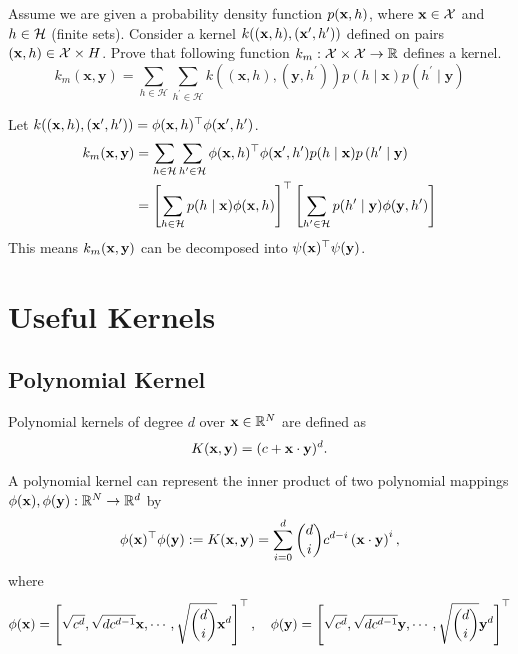 \begin{exercise} Assume we are given a probability density function $p(\mathbf{x}, h)$, where $\mathbf{x} \in  \mathcal{X}$ and $h \in  \mathcal{H}$ (finite sets). Consider a kernel $k((\mathbf{x}, h), (\mathbf{x}', h'))$ defined on pairs $(\mathbf{x}, h) \in  \mathcal{X} \times H$. Prove that following function $k_m: \mathcal{X} \times \mathcal{X} \rightarrow \mathbb{R}$ defines a kernel.
$$
k_{m}(\mathbf{x}, \mathbf{y})=\sum_{h \in \mathcal{H}} \sum_{h^{\prime} \in \mathcal{H}} k\left((\mathbf{x}, h),\left(\mathbf{y}, h^{\prime}\right)\right) p(h \mid \mathbf{x}) p\left(h^{\prime} \mid \mathbf{y}\right)
$$
\end{exercise}
\begin{sol}
Let $k((\mathbf{x}, h), (\mathbf{x}', h')) = \phi(\mathbf{x}, h)^\top \phi(\mathbf{x}', h')$.
\begin{align}
	k_m(\mathbf{x}, \mathbf{y}) & = \sum_{h \in \mathcal{H}} \sum_{h' \in \mathcal{H}} \phi(\mathbf{x}, h)^\top \phi(\mathbf{x}', h') p(h \mid \mathbf{x}) p\left(h^{\prime} \mid \mathbf{y}\right) \\
	& = \left[ \sum_{h \in \mathcal{H}} p(h \mid \mathbf{x}) \phi(\mathbf{x}, h) \right]^\top \left[ \sum_{h' \in \mathcal{H}} p(h' \mid \mathbf{y}) \phi(\mathbf{y}, h') \right]
\end{align}
This means $k_m(\mathbf{x}, \mathbf{y})$ can be decomposed into $\psi(\mathbf{x})^\top \psi(\mathbf{y})$.
\end{sol}


\section{Useful Kernels}
\subsection{Polynomial Kernel}
\begin{definition} Polynomial kernels of degree $d$ over $\mathbf{x} \in \mathbb{R}^N$ are defined as
	$$
	K(\mathbf{x}, \mathbf{y}) = (c + \mathbf{x} \cdot \mathbf{y})^d.
	$$
\end{definition}
A polynomial kernel can represent the inner product of two polynomial mappings $\phi(\mathbf{x}), \phi(\mathbf{y}): \mathbb{R}^N \rightarrow \mathbb{R}^d$ by
	\begin{equation}
	\phi(\mathbf{x})^\top \phi(\mathbf{y}) := K(\mathbf{x}, \mathbf{y}) = \sum_{i=0}^{d}{d \choose i} c^{d-i}\left(\mathbf{x} \cdot \mathbf{y}\right)^{i},\end{equation}
where
$$\phi(\mathbf{x}) = \left[\sqrt{c^d}, \sqrt{d c^{d - 1}} \mathbf{x}, \cdots,  \sqrt{{d \choose i}} \mathbf{x}^d \right]^\top, \quad \phi(\mathbf{y}) = \left[\sqrt{c^d}, \sqrt{d c^{d - 1}} \mathbf{y}, \cdots,  \sqrt{{d \choose i}} \mathbf{y}^d \right]^\top
$$

